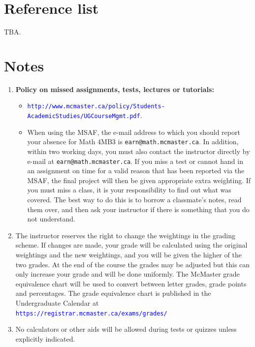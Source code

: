 \documentclass[12pt]{article}
\newcommand{\url}[1]{{\tt\textcolor{blue}{#1}}}
\begin{document}
\begin{center}
\section*{Reference list}

TBA. 

\section*{Notes}

\begin{enumerate}\addtolength{\itemsep}{-0.5\baselineskip}

\item {\bf Policy on missed assignments, tests, lectures or tutorials:} 
\begin{itemize}
\item \url{http://www.mcmaster.ca/policy/Students-AcademicStudies/UGCourseMgmt.pdf}.
\item When using the MSAF, the e-mail address to which you should report your absence for Math 4MB3 is {\tt earn@math.mcmaster.ca}.  In addition, within two working days, you must also contact the instructor directly by e-mail at {\tt earn@math.mcmaster.ca}.  If you miss a test or cannot hand in an assignment on time for a valid reason that has been reported via the MSAF, the final project will then be given appropriate extra weighting.  If you must miss a class, it is your responsibility to find out what was covered.  The best way to do this is to borrow a classmate's notes, read them over, and then ask your instructor if there is something that you do not understand.
\end{itemize}

\item The instructor reserves the right to change the weightings in the grading scheme. If changes are made, your grade will be calculated using the original weightings and the new weightings, and you will be given the higher of the two grades.  At the end of the course the grades may be adjusted but this can only increase your grade and will be done uniformly.  The McMaster grade equivalence chart will be used to convert between letter grades, grade points and percentages.  The grade equivalence chart is published in the Undergraduate Calendar at \url{https://registrar.mcmaster.ca/exams/grades/}

\item No calculators or other aids will be allowed during tests or quizzes unless explicitly indicated.


\end{enumerate}
\end{center}
\end{document}
